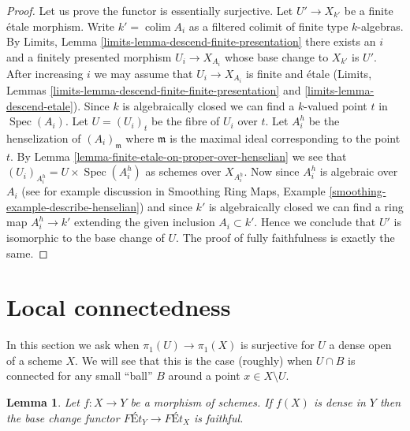 \documentclass{stacks-project}
\theoremstyle{plain}
\newtheorem{lemma}[subsection]{Lemma}
\theoremstyle{definition}
\theoremstyle{remark}
\numberwithin{equation}{subsection}
\def\colim{\mathop{\mathrm{colim}}\nolimits}
\def\Spec{\mathop{\mathrm{Spec}}}
\begin{document}
\begin{proof}
Let us prove the functor is essentially surjective.
Let $U' \to X_{k'}$ be a finite \'etale morphism.
Write $k' = \colim A_i$ as a filtered colimit of finite type $k$-algebras.
By Limits, Lemma \ref{limits-lemma-descend-finite-presentation}
there exists an $i$ and a finitely presented morphism $U_i \to X_{A_i}$
whose base change to $X_{k'}$ is $U'$. After increasing $i$
we may assume that $U_i \to X_{A_i}$ is finite and \'etale
(Limits, Lemmas \ref{limits-lemma-descend-finite-finite-presentation} and
\ref{limits-lemma-descend-etale}).
Since $k$ is algebraically closed we can find a
$k$-valued point $t$ in $\Spec(A_i)$. Let $U = (U_i)_t$ be the
fibre of $U_i$ over $t$. Let $A_i^h$ be the
henselization of $(A_i)_{\mathfrak m}$ where $\mathfrak m$ is
the maximal ideal corresponding to the point $t$. By
Lemma \ref{lemma-finite-etale-on-proper-over-henselian}
we see that $(U_i)_{A_i^h} = U \times \Spec(A_i^h)$ as schemes
over $X_{A_i^h}$. Now since
$A_i^h$ is algebraic over $A_i$ (see for example discussion in
Smoothing Ring Maps, Example \ref{smoothing-example-describe-henselian})
and since $k'$ is algebraically closed
we can find a ring map $A_i^h \to k'$ extending the given
inclusion $A_i \subset k'$. Hence we conclude that $U'$
is isomorphic to the base change of $U$.
The proof of fully faithfulness is exactly the same.
\end{proof}








\section{Local connectedness}
\label{section-unibranch}

\noindent
In this section we ask when $\pi_1(U) \to \pi_1(X)$ is surjective
for $U$ a dense open of a scheme $X$. We will see that this is the
case (roughly) when $U \cap B$ is connected for any small
``ball'' $B$ around a point $x \in X \setminus U$.

\begin{lemma}
\label{lemma-dense-faithful}
Let $f : X \to Y$ be a morphism of schemes. If $f(X)$ is dense in $Y$
then the base change functor $\textit{F\'Et}_Y \to \textit{F\'Et}_X$
is faithful.
\end{lemma}
\end{document}
